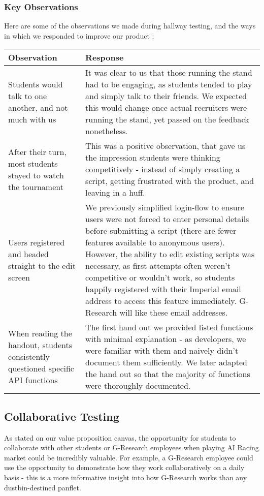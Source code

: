 \subsubsection{Key Observations}

Here are some of the observations we made during hallway testing, and the ways in which we responded to improve our product : \\

\begin{tabularx}{\textwidth}{ | X | p{} |}
\hline
Observation & Response \\
\hline\hline
Students would talk to one another, and not much with us 
	& It was clear to us that those running the stand had to be engaging, as students tended to play and simply talk to their friends. We expected this would change once actual recruiters were running the stand, yet passed on the feedback nonetheless. \\ \hline
After their turn, most students stayed to watch the tournament
	& This was a positive observation, that gave us the impression students were thinking competitively - instead of simply creating a script, getting frustrated with the product, and leaving in a huff. \\ \hline 
Users registered and headed straight to the edit screen 
	& We previously simplified login-flow to ensure users were not forced to enter personal details before submitting a script (there are fewer features available to anonymous users). However, the ability to edit existing scripts was necessary, as first attempts often weren't competitive or wouldn't work, so students happily registered with their Imperial email address to access this feature immediately. G-Research will like these email addresses. \\ \hline 
When reading the handout, students consistently questioned specific API functions
	& The first hand out we provided listed functions with minimal explanation - as developers, we were familiar with them and naively didn't document them sufficiently. We later adapted the hand out so that the majority of functions were thoroughly documented. \\ 
\hline
\end{tabularx}

\subsection{Collaborative Testing}

As stated on our value proposition canvas, the opportunity for students to collaborate with other students or G-Research employees when playing AI Racing market could be incredibly valuable. For example, a G-Research employee could use the opportunity to demonstrate how they work collaboratively on a daily basis - this is a more informative insight into how G-Research works than any dustbin-destined panflet.

